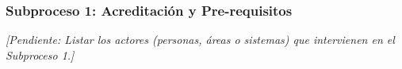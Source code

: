 \subsubsection{Subproceso 1: Acreditación y Pre-requisitos}

\textit{[Pendiente: Listar los actores (personas, áreas o sistemas) que intervienen en el Subproceso 1.]}

